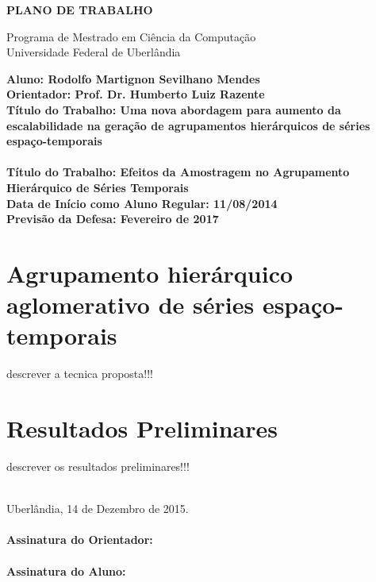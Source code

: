 \documentclass[12pt]{article}
\begin{document}
\begin{center}
    \bf{
        \LARGE{PLANO DE TRABALHO}
        \\ $\ $\\
    }
    
    \Large{
        Programa de Mestrado em Ciência da Computação\\
        Universidade Federal de Uberlândia
    }
    \\ $\ $\\
\end{center}

\begin{center}
    \bf{
        Aluno: Rodolfo Martignon Sevilhano Mendes\\ $\ $\\
        Orientador: Prof. Dr. Humberto Luiz Razente\\ $\ $\\
        Título do Trabalho: Uma nova abordagem para aumento da escalabilidade na
				geração de agrupamentos hierárquicos de séries espaço-temporais\\ \ \ \\
        Título do Trabalho: Efeitos da Amostragem no Agrupamento \\
				Hierárquico de Séries Temporais\\ $\ $\\
        Data de Início como Aluno Regular: 11/08/2014\\ $\ $\\
        Previsão da Defesa: Fevereiro de 2017\\ $\ $\\
    }
\end{center}






\section{Agrupamento hierárquico aglomerativo de séries espaço-temporais}

descrever a tecnica proposta!!!

\section{Resultados Preliminares}

descrever os resultados preliminares!!!




\ \\
\noindent Uberlândia, 14 de Dezembro de 2015.\\

\ \\
\noindent \textbf{Assinatura do Orientador:} \\

\ \\
\noindent \textbf{Assinatura do Aluno:}


\end{document}
